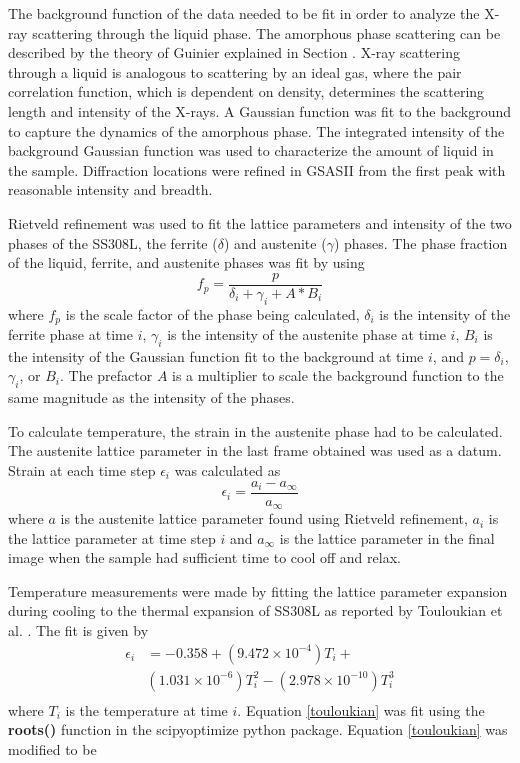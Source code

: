 \documentclass[twocolumn,nofootinbib,notitlepage,aps]{revtex4-1}
\begin{document}
The background function of the data needed to be fit in order to analyze the X-ray scattering through the liquid phase. The amorphous phase scattering can be described by the theory of Guinier explained in Section \cite{Guinier1994}. X-ray scattering through a liquid is analogous to scattering by an ideal gas, where the pair correlation function, which is dependent on density, determines the scattering length and intensity of the X-rays. A Gaussian function was fit to the background to capture the dynamics of the amorphous phase. The integrated intensity of the background Gaussian function was used to characterize the amount of liquid in the sample. Diffraction locations were refined in GSASII from the first peak with reasonable intensity and breadth. 

Rietveld refinement was used to fit the lattice parameters and intensity of the two phases of the SS308L, the ferrite ($\delta$) and austenite ($\gamma$) phases. The phase fraction of the liquid, ferrite, and austenite phases was fit by using
\begin{equation}
	f_{p} = \frac{p}{\delta_i + \gamma_i + A*B_i}
	\label{phasefrac}
\end{equation}
where $f_{p}$ is the scale factor of the phase being calculated, $\delta_i$ is the intensity of the ferrite phase at time $i$, $\gamma_i$ is the intensity of the austenite phase at time $i$, $B_i$ is the intensity of the Gaussian function fit to the background at time $i$, and $p = \delta_i$, $\gamma_i$, or $B_i$. The prefactor $A$ is a multiplier to scale the background function to the same magnitude as the intensity of the phases. 

To calculate temperature, the strain in the austenite phase had to be calculated. The austenite lattice parameter in the last frame obtained was used as a datum. Strain at each time step $\epsilon_i$ was calculated as
\begin{equation}
	\epsilon_i  = \frac{a_i - a_\infty}{a_\infty}
	\label{strain}
\end{equation}
where $a$ is the austenite lattice parameter found using Rietveld refinement, $a_i$ is the lattice parameter at time step $i$ and $a_\infty$ is the lattice parameter in the final image when the sample had sufficient time to cool off and relax.

Temperature measurements were made by fitting the lattice parameter expansion during cooling to the thermal expansion of SS308L as reported by Touloukian et al. \cite{Touloukian1975}. The fit is given by
\begin{equation}
\begin{split}
	\epsilon_i & = -0.358 + (9.472\times10^{-4})T_i + \\
	& (1.031\times10^{-6})T_i^2 - (2.978\times10^{-10})T_i^3\\
	\label{touloukian}
	\end{split}
\end{equation}
where $T_i$ is the temperature at time $i$. Equation \ref{touloukian} was fit using the \textbf{roots()} function in the scipy\textunderscore optimize python package. Equation \ref{touloukian} was modified to be 
\end{document}
